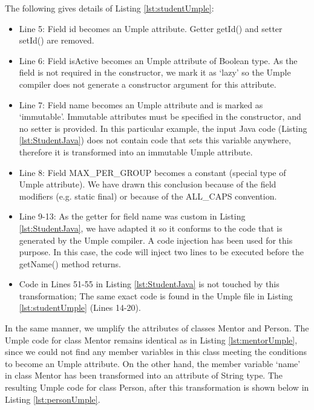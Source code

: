 
The following gives details of Listing \ref{lst:studentUmple}:
\begin{itemize}
\item Line 5: Field id becomes an Umple attribute. Getter getId() and setter setId() are removed.


\item Line 6: Field isActive becomes an Umple attribute of Boolean type.  As the field is not required in the constructor, we mark it as `lazy' so the Umple compiler does not generate a constructor argument for this attribute. 

\item Line 7: Field name becomes an Umple attribute and is marked as `immutable'. Immutable attributes must be specified in the constructor, and no setter is provided. In this particular example, the input Java code (Listing \ref{lst:StudentJava}) does not contain code that sets this variable anywhere, therefore it is transformed into an immutable Umple attribute. 

\item Line 8: Field MAX\_PER\_GROUP becomes a constant (special type of Umple attribute). We have drawn this conclusion because of the field modifiers (e.g. static final) or because of the ALL\_CAPS convention. 

\item Line 9-13: As the getter for field name was custom in Listing \ref{lst:StudentJava}, we have adapted it so it conforms to the code that is generated by the Umple compiler. A code injection has been used for this purpose. In this case, the code will inject two lines to be executed before the getName() method returns.

\item Code in Lines 51-55 in Listing \ref{lst:StudentJava} is not touched by this transformation; The same exact code is found in the Umple file in Listing \ref{lst:studentUmple} (Lines 14-20).

\end{itemize}

In the same manner, we umplify the attributes of classes Mentor and Person.
The Umple code for class Mentor remains identical as in Listing \ref{lst:mentorUmple}, since we could not find any member variables in this class meeting the conditions to become an Umple attribute. On the other hand, the member variable `name' in class Mentor has been transformed into an attribute of String type. The resulting Umple code for class Person, after this transformation is shown below in Listing \ref{lst:personUmple}.

